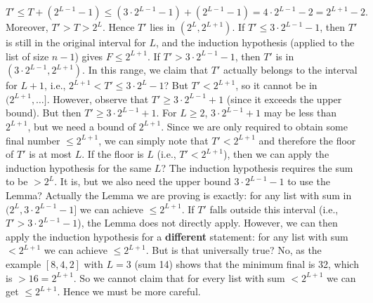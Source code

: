 \[
    T' \le T + (2^{L-1} - 1) \le (3 \cdot 2^{L-1} - 1) + (2^{L-1} - 1) = 4 \cdot 2^{L-1} - 2 = 2^{L+1} - 2.
\]
Moreover, \(T' > T > 2^{L}\). Hence \(T'\) lies in \((2^{L}, 2^{L+1})\). If \(T' \le 3 \cdot 2^{L-1} - 1\), then \(T'\) is still in the original interval for \(L\), and the induction hypothesis (applied to the list of size \(n-1\)) gives \(F \le 2^{L+1}\). If \(T' > 3 \cdot 2^{L-1} - 1\), then \(T'\) is in \((3 \cdot 2^{L-1}, 2^{L+1})\). In this range, we claim that \(T'\) actually belongs to the interval for \(L+1\), i.e., \(2^{L+1} < T' \le 3 \cdot 2^{L} - 1\)? But \(T' < 2^{L+1}\), so it cannot be in \((2^{L+1}, \dots]\). However, observe that \(T' \ge 3 \cdot 2^{L-1} + 1\) (since it exceeds the upper bound). But then \(T' \ge 3 \cdot 2^{L-1} + 1\). For \(L \ge 2\), \(3 \cdot 2^{L-1} + 1\) may be less than \(2^{L+1}\), but we need a bound of \(2^{L+1}\). Since we are only required to obtain some final number \(\le 2^{L+1}\), we can simply note that \(T' < 2^{L+1}\) and therefore the floor of \(T'\) is at most \(L\). If the floor is \(L\) (i.e., \(T' < 2^{L+1}\)), then we can apply the induction hypothesis for the same \(L\)? The induction hypothesis requires the sum to be \(> 2^{L}\). It is, but we also need the upper bound \(3 \cdot 2^{L-1} - 1\) to use the Lemma? Actually the Lemma we are proving is exactly: for any list with sum in \((2^{L}, 3 \cdot 2^{L-1} - 1]\) we can achieve \(\le 2^{L+1}\). If \(T'\) falls outside this interval (i.e., \(T' > 3 \cdot 2^{L-1} - 1\)), the Lemma does not directly apply. However, we can then apply the induction hypothesis for a \textbf{different} statement: for any list with sum \(< 2^{L+1}\) we can achieve \(\le 2^{L+1}\). But is that universally true? No, as the example \([8,4,2]\) with \(L=3\) (sum 14) shows that the minimum final is 32, which is \(> 16 = 2^{L+1}\). So we cannot claim that for every list with sum \(< 2^{L+1}\) we can get \(\le 2^{L+1}\). Hence we must be more careful.\par
{}
